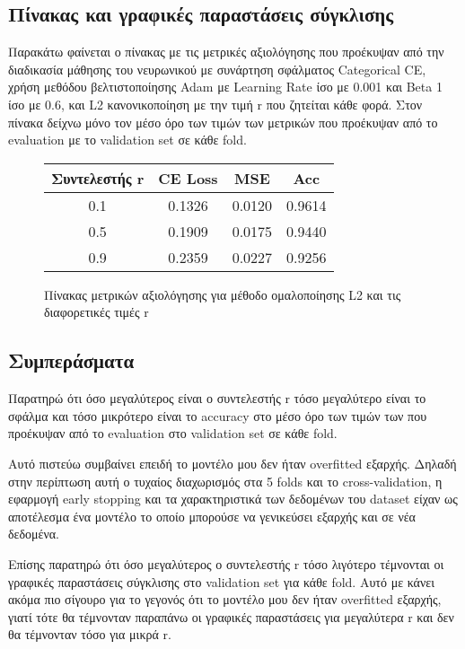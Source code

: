 \documentclass[12pt,a4paper]{article}
\begin{document}
\subsection{Πίνακας και γραφικές παραστάσεις σύγκλισης}

Παρακάτω φαίνεται ο πίνακας με τις μετρικές αξιολόγησης που προέκυψαν από την διαδικασία μάθησης του νευρωνικού με συνάρτηση σφάλματος Categorical CE, χρήση μεθόδου βελτιστοποίησης Adam με Learning Rate ίσο με 0.001 και Beta 1 ίσο με 0.6, και L2 κανονικοποίηση με την τιμή r που ζητείται κάθε φορά. Στον πίνακα δείχνω μόνο τον μέσο όρο των τιμών των μετρικών που προέκυψαν από το evaluation με το validation set σε κάθε fold.

\begin{figure}[H]
    \begin{center}
    \begin{tabular}{ |c|c|c|c| } 
        \hline
        \textbf{Συντελεστής r} & \textbf{CE Loss} & \textbf{MSE} & \textbf{Acc} \\ \hline
        0.1 & 0.1326 & 0.0120 & 0.9614 \\
        \hline
        0.5 & 0.1909 & 0.0175 & 0.9440 \\
        \hline
        0.9 & 0.2359 & 0.0227 & 0.9256 \\ 
        \hline
    \end{tabular}
    \end{center}
    \caption{Πίνακας μετρικών αξιολόγησης για μέθοδο ομαλοποίησης L2 και τις διαφορετικές τιμές r}
\end{figure}

\subsection{Συμπεράσματα}

Παρατηρώ ότι όσο μεγαλύτερος είναι ο συντελεστής r τόσο μεγαλύτερο είναι το σφάλμα και τόσο μικρότερο είναι το accuracy στο μέσο όρο των τιμών των που προέκυψαν από το evaluation στο validation set σε κάθε fold. 

Αυτό πιστεύω συμβαίνει επειδή το μοντέλο μου δεν ήταν overfitted εξαρχής. Δηλαδή στην περίπτωση αυτή ο τυχαίος διαχωρισμός στα 5 folds και το cross-validation, η εφαρμογή early stopping και τα χαρακτηριστικά των δεδομένων του dataset είχαν ως αποτέλεσμα ένα μοντέλο το οποίο μπορούσε να γενικεύσει εξαρχής και σε νέα δεδομένα.

Επίσης παρατηρώ ότι όσο μεγαλύτερος ο συντελεστής r τόσο λιγότερο τέμνονται οι γραφικές παραστάσεις σύγκλισης στο validation set για κάθε fold. Αυτό με κάνει ακόμα πιο σίγουρο για το γεγονός ότι το μοντέλο μου δεν ήταν overfitted εξαρχής, γιατί τότε θα τέμνονταν παραπάνω οι γραφικές παραστάσεις για μεγαλύτερα r και δεν θα τέμνονταν τόσο για μικρά r.
\end{document}
